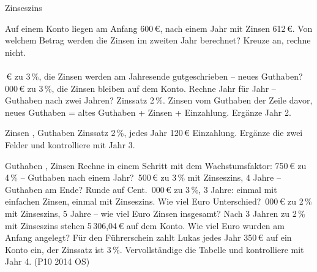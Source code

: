 \setcounter{aufgabe}{14}

\begin{aufgabe}{Zinseszins}
\begin{teile}
\teil Auf einem Konto liegen am Anfang 600\,€, nach einem Jahr mit Zinsen 612\,€. Von welchem Betrag werden die Zinsen im zweiten Jahr berechnet? Kreuze an, rechne nicht. \\  \\ 
\,€ zu 3\,\%, die Zinsen werden am Jahresende gutgeschrieben – neues Guthaben? \leerfeld[€]
\,000\,€ zu 3\,\%, die Zinsen bleiben auf dem Konto. Rechne Jahr für Jahr – Guthaben nach zwei Jahren? \leerfeld[€]
\teil Zinssatz 2\,\%. Zinsen vom Guthaben der Zeile davor, neues Guthaben = altes Guthaben + Zinsen + Einzahlung. Ergänze Jahr 2.

Zinsen \leerfeld[€] , Guthaben \leerfeld[€]
\teil Zinssatz 2\,\%, jedes Jahr 120\,€ Einzahlung. Ergänze die zwei Felder und kontrolliere mit Jahr 3.

Guthaben \leerfeld[€] , Zinsen \leerfeld[€]
\teil Rechne in einem Schritt mit dem Wachstumsfaktor: 750\,€ zu 4\,\% – Guthaben nach einem Jahr? \leerfeld[€]
\,500\,€ zu 3\,\% mit Zinseszins, 4 Jahre – Guthaben am Ende? Runde auf Cent. \leerfeld[€]
\,000\,€ zu 3\,\%, 3 Jahre: einmal mit einfachen Zinsen, einmal mit Zinseszins. Wie viel Euro Unterschied? \leerfeld[€]
\,000\,€ zu 2\,\% mit Zinseszins, 5 Jahre – wie viel Euro Zinsen insgesamt? \leerfeld[€]
\teil Nach 3 Jahren zu 2\,\% mit Zinseszins stehen 5\,306,04\,€ auf dem Konto. Wie viel Euro wurden am Anfang angelegt? \leerfeld[€]
\teil Für den Führerschein zahlt Lukas jedes Jahr 350\,€ auf ein Konto ein, der Zinssatz ist 3\,\%. Vervollständige die Tabelle und kontrolliere mit Jahr 4. \hfill (P10 2014 OS) \\


\end{teile}
\end{aufgabe}
